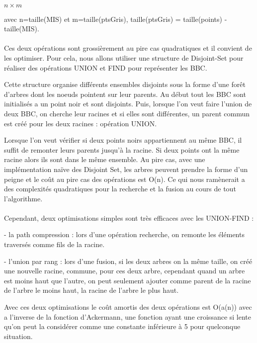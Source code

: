 \paragraph{}
\(n \times m\)

avec n=taille(MIS) et m=taille(ptsGris), taille(ptsGris) = taille(points) - taille(MIS).

\paragraph{}
Ces deux opérations sont grossièrement au pire cas quadratiques et il convient de les optimiser. Pour cela, nous allons utiliser une structure de Disjoint-Set pour réaliser des opérations UNION et FIND pour représenter les BBC.

Cette structure organise différents ensembles disjoints sous la forme d'une forêt d'arbres dont les noeuds pointent sur leur parents. Au début tout les BBC sont initialisés a un point noir et sont disjoints. Puis, lorsque l'on veut faire l'union de deux BBC, on cherche leur racines et si elles sont différentes, un parent commun est créé pour les deux racines : opération UNION.

Lorsque l'on veut vérifier si deux points noirs appartiennent au même BBC, il suffit de remonter leurs parents jusqu'à la racine. Si deux points ont la même racine alors ils sont dans le même ensemble.
Au pire cas, avec une implémentation naïve des Disjoint Set, les arbres peuvent prendre la forme d'un peigne et le coût au pire cas des opérations est O(n). Ce qui nous ramènerait a des complexités quadratiques pour la recherche et la fusion au cours de tout l'algorithme.

\paragraph{}
Cependant, deux optimisations simples sont très efficaces avec les UNION-FIND :

- la path compression : lors d'une opération recherche, on remonte les éléments traversés comme fils de la racine.

- l'union par rang : lors d'une fusion, si les deux arbres on la même taille, on créé une nouvelle racine, commune, pour ces deux arbre, cependant quand un arbre est moins haut que l'autre, on peut seulement ajouter comme parent de la racine de l'arbre le moins haut, la racine de l'arbre le plus haut.

Avec ces deux optimisations le coût amortis des deux opérations est O(a(n)) avec a l'inverse de la fonction d'Ackermann, une fonction ayant une croissance si lente qu'on peut la considérer comme une constante inférieure à 5 pour quelconque situation.

